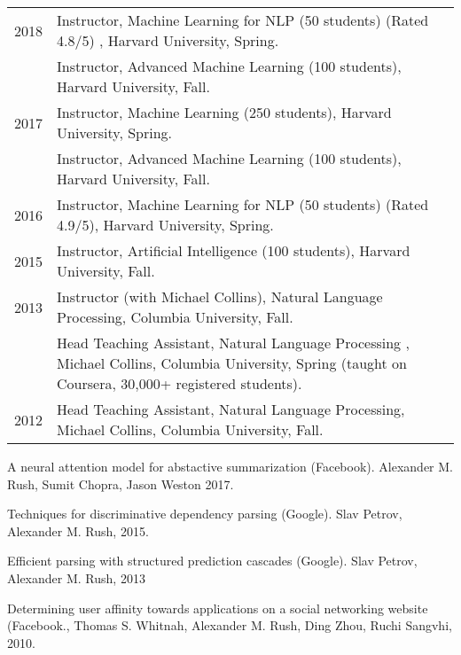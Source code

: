 \documentclass[10pt]{article}
\begin{document}
\begin{tabular}{lp{11.5cm}}
	2018      & \ind  Instructor, Machine Learning for NLP (50 students) (Rated 4.8/5) , Harvard University, Spring.                                                        \\
	          & \ind  Instructor, Advanced Machine Learning (100 students), Harvard University, Fall.                                                                       \\
	2017      & \ind  Instructor, Machine Learning (250 students), Harvard University, Spring.                                                                              \\
	          & \ind  Instructor, Advanced Machine Learning (100 students), Harvard University, Fall.                                                                       \\
	2016      & \ind  Instructor, Machine Learning for NLP (50 students) (Rated 4.9/5), Harvard University, Spring.                                                         \\
	2015      & \ind  Instructor, Artificial Intelligence (100 students), Harvard University, Fall.                                                                         \\
	2013      & \ind  Instructor (with Michael Collins), Natural Language Processing, Columbia University, Fall.                                                            \\
	          & \ind Head Teaching Assistant, Natural Language Processing , Michael Collins, Columbia University, Spring (taught on Coursera, 30,000+ registered students). \\
	2012      & \ind Head Teaching Assistant, Natural Language Processing, Michael Collins, Columbia University, Fall.                                                      \\
\end{tabular}

\bigskip
{}

\ind A neural attention model for abstactive summarization (Facebook). Alexander M. Rush, Sumit Chopra, Jason Weston 2017.
\medskip

\ind Techniques for discriminative dependency parsing (Google). Slav Petrov, Alexander M. Rush, 2015.
\medskip

\ind Efficient parsing with structured prediction cascades (Google). Slav Petrov, Alexander M. Rush, 2013
\medskip

\ind  Determining user affinity towards applications on a social networking website (Facebook., Thomas S. Whitnah, Alexander M. Rush, Ding Zhou, Ruchi Sangvhi, 2010.
\end{document}
